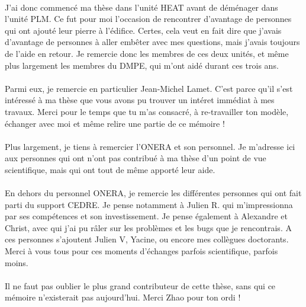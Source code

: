   \paragraph{}
  J'ai donc commencé ma thèse dans l'unité HEAT avant de déménager dans l'unité PLM.
  Ce fut pour moi l'occasion de rencontrer d'avantage de personnes qui ont ajouté leur pierre à l'édifice.
  Certes, cela veut en fait dire que j'avais d'avantage de personnes à aller embêter avec mes questions, mais j'avais toujours de l'aide en retour.
  Je remercie donc les membres de ces deux unités, et même plus largement les membres du DMPE, qui m'ont aidé durant ces trois ans.

  \paragraph{}
  Parmi eux, je remercie en particulier Jean-Michel Lamet.
  C'est parce qu'il s'est intéressé à ma thèse que vous avons pu trouver un intéret immédiat à mes travaux.
  Merci pour le temps que tu m'as consacré, à re-travailler ton modèle, échanger avec moi et même relire une partie de ce mémoire !

  \paragraph{}
  Plus largement, je tiens à remercier l'ONERA et son personnel.
  Je m'adresse ici aux personnes qui ont n'ont pas contribué à ma thèse d'un point de vue scientifique, mais qui ont tout de même apporté leur aide.

  \paragraph{}
  En dehors du personnel ONERA, je remercie les différentes personnes qui ont fait parti du support CEDRE.
  Je pense notamment à Julien R. qui m'impressionna par ses compétences et son investissement.
  Je pense également à Alexandre et Christ, avec qui j'ai pu râler sur les problèmes et les bugs que je rencontrais.
  A ces personnes s'ajoutent Julien V, Yacine, ou encore mes collègues doctorants.
  Merci à vous tous pour ces moments d'échanges parfois scientifique, parfois moins.

  \paragraph{}
  Il ne faut pas oublier le plus grand contributeur de cette thèse, sans qui ce mémoire n'existerait pas aujourd'hui.
  Merci Zhao pour ton ordi !

